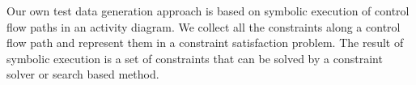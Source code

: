 Our own test data generation approach is based on symbolic execution of control flow paths in an activity diagram. We collect all the constraints along a control flow path and represent them in a constraint satisfaction problem. The result of symbolic execution is a set of constraints that can be solved by a constraint solver or search based method.
% 
% 
% 


